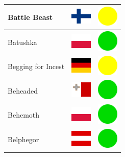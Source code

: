\documentclass[12pt, a4paper, twoside]{report}
\begin{document}
\begin{center}
\begin{longtable}{|p{5cm}|p{2cm}|p{2cm}|}
Battle Beast & \includegraphics[width=1cm]{4x3/fi} & \includegraphics[width=1cm]{likes/m} \\ \hline
Batushka & \includegraphics[width=1cm]{4x3/pl} & \includegraphics[width=1cm]{likes/y} \\ \hline
Begging for Incest & \includegraphics[width=1cm]{4x3/de} & \includegraphics[width=1cm]{likes/m} \\ \hline
Beheaded & \includegraphics[width=1cm]{4x3/mt} & \includegraphics[width=1cm]{likes/y} \\ \hline
Behemoth & \includegraphics[width=1cm]{4x3/pl} & \includegraphics[width=1cm]{likes/y} \\ \hline
Belphegor & \includegraphics[width=1cm]{4x3/at} & \includegraphics[width=1cm]{likes/y} \\ \hline

\end{longtable}
\end{center}
\end{document}
